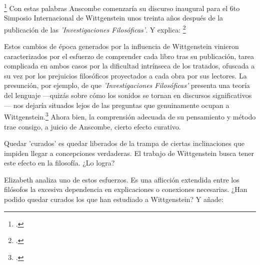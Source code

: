 \footcite[p.~181]{twocuts} 
Con estas palabras Anscombe comenzaría su discurso inaugural para el 6to
Simposio Internacional de Wittgenstein unos treinta años después de la
publicación de las \emph{'Investigaciones Filosóficas'}. Y explica:
\footcite[p.~181]{twocuts}

Estos cambios de época generados por la influencia de Wittgenstein vinieron
caracterizados por el esfuerzo de comprender cada libro tras su publicación,
tarea complicada en ambos casos por la dificultad intrínseca de los tratados,
ofuscada a su vez por los prejuicios filosóficos proyectados a cada obra por sus
lectores. La presunción, por ejemplo, de que \emph{'Investigaciones
  Filosóficas'} presenta una teoría del lenguaje ---quizás sobre cómo los
sonidos se tornan en discursos significativos--- nos dejaría situados lejos de
las preguntas que genuinamente ocupan a
Wittgenstein.\footcite[cf.~][p.~183]{twocuts} Ahora bien, la comprensión
adecuada de su pensamiento y método trae consigo, a juicio de Anscombe, cierto
efecto curativo.

Quedar 'curados' es quedar liberados de la trampa de ciertas inclinaciones que
impiden llegar a concepciones verdaderas. El trabajo de Wittgenstein busca tener
este efecto en la filosofía. ¿Lo logra?

Elizabeth analiza uno de estos esfuerzos. Es una aflicción extendida entre los
filósofos la excesiva dependencia en explicaciones o conexiones necesarias. ¿Han
podido quedar curados los que han estudiado a Wittgenstein? Y añade:

